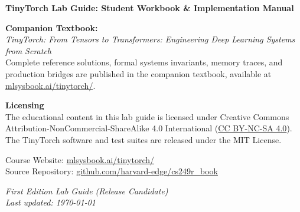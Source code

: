\begin{titlepage}
\clearpage
\thispagestyle{empty}
\vspace*{\fill}
\begin{flushleft}
{\fontsize{8.5}{12}\selectfont\color{bodygray!85}
\textbf{TinyTorch Lab Guide: Student Workbook \& Implementation Manual}\par
\vspace{1.0em}
\textbf{Companion Textbook:}\\
\textit{TinyTorch: From Tensors to Transformers: Engineering Deep Learning Systems from Scratch}\\
Complete reference solutions, formal systems invariants, memory traces, and production bridges are published in the companion textbook, available at \href{https://mlsysbook.ai/tinytorch/}{mlsysbook.ai/tinytorch/}.\par
\vspace{1.0em}
\textbf{Licensing}\\
The educational content in this lab guide is licensed under Creative Commons Attribution-NonCommercial-ShareAlike 4.0 International (\href{https://creativecommons.org/licenses/by-nc-sa/4.0/}{CC BY-NC-SA 4.0}).\\
The TinyTorch software and test suites are released under the MIT License.\par
\vspace{1.0em}
Course Website: \href{https://mlsysbook.ai/tinytorch/}{mlsysbook.ai/tinytorch/}\\
Source Repository: \href{https://github.com/harvard-edge/cs249r_book}{github.com/harvard-edge/cs249r\_book}\par
\vspace{1.0em}
\textit{First Edition Lab Guide (Release Candidate)}\\
\textit{Last updated: \today}\par
}
\end{flushleft}
\vspace{1.0cm}

\end{titlepage}
